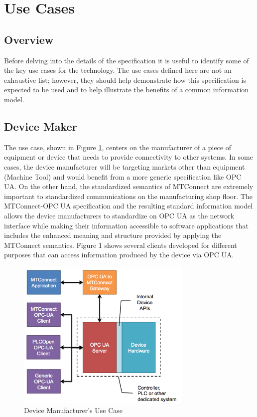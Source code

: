 \section{Use Cases}

\subsection{Overview}

Before delving into the details of the specification it is useful to identify some of the key use cases for the technology. The use cases defined here are not an exhaustive list; however, they should help demonstrate how this specification is expected to be used and to help illustrate the benefits of a common information model.

\subsection{Device Maker}

The use case, shown in Figure \ref{fig:device_mfg_use_case}, centers on the manufacturer of a piece of equipment or device that needs to provide connectivity to other systems. In some cases, the device manufacturer will be targeting markets other than equipment (Machine Tool) and would benefit from a more generic specification like OPC UA. On the other hand, the standardized semantics of MTConnect are extremely important to standardized communications on the manufacturing shop floor. The MTConnect-OPC UA specification and the resulting standard information model allows the device manufacturers to standardize on OPC UA as the network interface while making their information accessible to software applications that includes the enhanced meaning and structure provided by applying the MTConnect semantics. Figure 1 shows several clients developed for different purposes that can access information produced by the device via OPC UA.

\begin{figure}[h]
  \centering
  \includegraphics[width=0.75\textwidth]{diagrams/DeviceManufacturingUseCase.png}
  \caption{Device Manufacturer's Use Case}
  \label{fig:device_mfg_use_case}
\end{figure}

